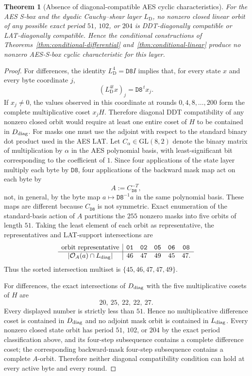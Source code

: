 \documentclass[10pt,reqno]{amsart}
\theoremstyle{plain}
\newtheorem{theorem}{Theorem}[section]
\theoremstyle{remark}\newtheorem{remark}[theorem]{Remark}
\theoremstyle{definition}\newtheorem{definition}[theorem]{Definition}
\newcommand{\hex}[1]{\mathtt{#1}}
\begin{document}
\begin{theorem}[Absence of diagonal-compatible AES cyclic characteristics]\label{thm:aes-no-diagonal-cycles}
For the AES S-box and the dyadic Cauchy--shear layer $L_{\mathrm{D}}$, no nonzero closed
linear orbit of any possible exact period $51$, $102$, or $204$ is
DDT-diagonally compatible or LAT-diagonally compatible. Hence the
conditional constructions of Theorems~\ref{thm:conditional-differential}
and~\ref{thm:conditional-linear} produce no nonzero AES-S-box cyclic
characteristic for this layer.
\end{theorem}
\begin{proof}
For differences, the identity $L_{\mathrm{D}}^4=\hex{D8}I$ implies that, for every state $x$ and
every byte coordinate $j$,
\[
 (L_{\mathrm{D}}^{4t}x)_j=\hex{D8}^{\,t}x_j.
\]
If $x_j\ne0$, the values observed in this coordinate at rounds
$0,4,8,\ldots,200$ form the complete multiplicative coset $x_jH$.
Therefore diagonal DDT compatibility of any nonzero closed orbit would
require at least one entire coset of $H$ to be contained in
$D_{\rm diag}$. For masks one must use the adjoint with respect to the standard binary dot product used in the AES LAT.  Let $C_{\alpha}\in\mathrm{GL}(8,2)$ denote the binary matrix of multiplication by $\alpha$ in the AES polynomial basis, with least-significant bit corresponding to the coefficient of $1$.  Since four applications of the state layer multiply each byte by $\hex{D8}$, four applications of the backward mask map act on each byte by
\[
 A:=C_{\hex{D8}}^{-T},
\]
not, in general, by the byte map $a\mapsto\hex{D8}^{-1}a$ in the same polynomial basis.  These maps are different because $C_{\hex{D8}}$ is not symmetric.  Exact enumeration of the standard-basis action of $A$ partitions the $255$ nonzero masks into five orbits of length $51$.  Taking the least element of each orbit as representative, the representatives and LAT-support intersections are
\[
\begin{array}{c|ccccc}
\text{orbit representative}&\hex{01}&\hex{02}&\hex{05}&\hex{06}&\hex{08}\\
\hline
|\mathcal O_A(a)\cap L_{\rm diag}|&46&47&49&45&47.
\end{array}
\]
Thus the sorted intersection multiset is $\{45,46,47,47,49\}$.

For differences, the exact intersections of $D_{\rm diag}$ with the five multiplicative cosets of $H$ are
\[
 20,\ 25,\ 22,\ 22,\ 27.
\]
Every displayed number is strictly less than $51$.  Hence no multiplicative difference coset is contained in $D_{\rm diag}$ and no adjoint mask orbit is contained in $L_{\rm diag}$.  Every nonzero closed state orbit has period $51$, $102$, or $204$ by the exact period classification above, and its four-step subsequence contains a complete difference coset; the corresponding backward-mask four-step subsequence contains a complete $A$-orbit.  Therefore neither diagonal compatibility condition can hold at every active byte and every round.
\end{proof}
\end{document}
